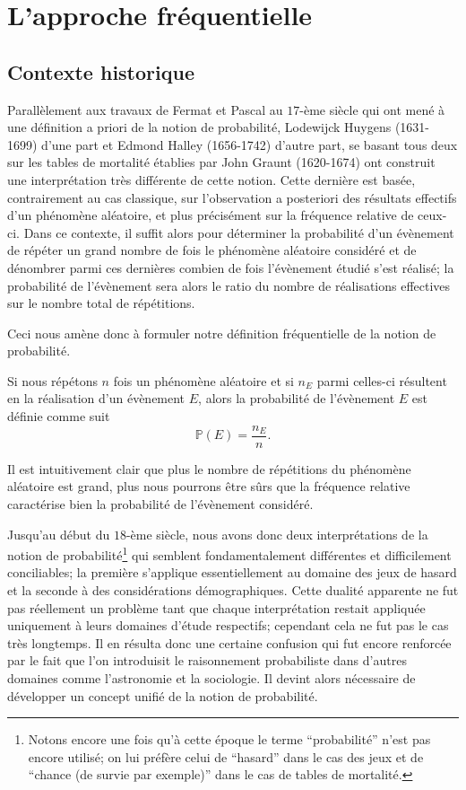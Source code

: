 \documentclass[11pt,a4paper]{article}
\begin{document}
\section{L'approche fréquentielle}

\subsection{Contexte historique}

Parallèlement aux travaux de Fermat et Pascal au $17$-ème siècle qui ont mené à une définition a priori de la notion de probabilité, Lodewijck Huygens (1631-1699) d'une part et Edmond Halley (1656-1742) d'autre part, se basant tous deux sur les tables de mortalité établies par John Graunt (1620-1674) ont construit une interprétation très différente de cette notion. Cette dernière est basée, contrairement au cas classique, sur l'observation a posteriori des résultats effectifs d'un phénomène aléatoire, et plus précisément sur la fréquence relative de ceux-ci. Dans ce contexte, il suffit alors pour déterminer la probabilité d'un évènement de répéter un grand nombre de fois le phénomène aléatoire considéré et de dénombrer parmi ces dernières combien de fois l'évènement étudié s'est réalisé; la probabilité de l'évènement sera alors le ratio du nombre de réalisations effectives sur le nombre total de répétitions.

Ceci nous amène donc à formuler notre définition fréquentielle de la notion de probabilité.

\begin{Def}[Fréquentielle]{\rm Si nous répétons $n$ fois un phénomène aléatoire et si $n_E$ parmi celles-ci résultent en la réalisation d'un évènement $E$, alors la probabilité de l'évènement $E$ est définie comme suit
\[\mathbb{P}(E) = \frac{n_E}{n}.\]
}
\end{Def}

Il est intuitivement clair que plus le nombre de répétitions du phénomène aléatoire est grand, plus nous pourrons être sûrs que la fréquence relative caractérise bien la probabilité de l'évènement considéré.

Jusqu'au début du $18$-ème siècle, nous avons donc deux interprétations de la notion de probabilité\footnote{Notons encore une fois qu'à cette époque le terme ``probabilité'' n'est pas encore utilisé; on lui préfère celui de ``hasard'' dans le cas des jeux et de ``chance (de survie par exemple)'' dans le cas de tables de mortalité.} qui semblent fondamentalement différentes et difficilement conciliables; la première s'applique essentiellement au domaine des jeux de hasard et la seconde à des considérations démographiques. Cette dualité apparente ne fut pas réellement un problème tant que chaque interprétation restait appliquée uniquement à leurs domaines d'étude respectifs; cependant cela ne fut pas le cas très longtemps. Il en résulta donc une certaine confusion qui fut encore renforcée par le fait que l'on introduisit le raisonnement probabiliste dans d'autres domaines comme l'astronomie et la sociologie. Il devint alors nécessaire de développer un concept unifié de la notion de probabilité.
\end{document}
